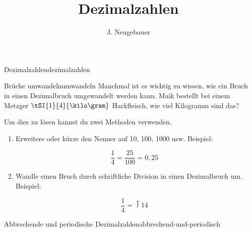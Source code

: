 \documentclass[12pt,a5paper,landscape]{scrartcl}
\author{J. Neugebauer}
\title{Dezimalzahlen}
\date{\Heute}
\begin{document}
	\begin{hilfekarte}{Dezimalzahlen}{dezimalzahlen}

	\end{hilfekarte}

	\begin{hilfekarte}{Brüche umwandeln}{umwandeln}
		Manchmal ist es wichtig zu wissen, wie ein Bruch in einen Dezimalbruch umgewandelt werden kann. Maik bestellt bei einem Metzger $\tSI{1}{4}{\kilo\gram}$ Hackfleisch, wie viel Kilogramm sind das?

		Um dies zu lösen kannst du zwei Methoden verwenden.
		\begin{enumerate}
			\item Erweitere oder kürze den Nenner auf 10, 100, 1000 usw. Beispiel:

			\[ \dfrac{1}{4} = \dfrac{25	}{100} = 0,25 \]
			\item Wandle einen Bruch durch schriftliche Division in einen Dezimalbruch um. Beispiel:

			\[ \dfrac{1}{4} = \longdivision{1}{4} \]
		\end{enumerate}
	\end{hilfekarte}

	\begin{hilfekarte}{Abbrechende und periodische Dezimalzahlen}{abbrechend-und-periodisch}

	\end{hilfekarte}
\end{document}
